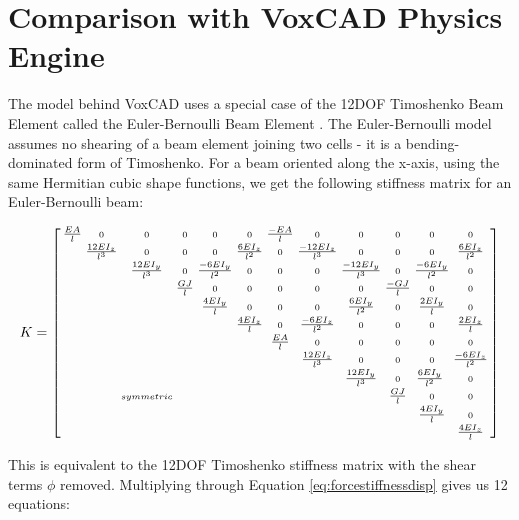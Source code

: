 {\section{Comparison with VoxCAD Physics Engine}

The model behind VoxCAD uses a special case of the 12DOF Timoshenko Beam Element called the Euler-Bernoulli Beam Element \cite{Hiller2014a}.  The Euler-Bernoulli model assumes no shearing of a beam element joining two cells - it is a bending-dominated form of Timoshenko.  For a beam oriented along the x-axis, using the same Hermitian cubic shape functions, we get the following stiffness matrix for an Euler-Bernoulli beam:

\[ K =  \small {\left[ \begin{smallmatrix}
\tfrac{EA}{l} & 0 & 0 & 0 & 0 & 0 & \tfrac{-EA}{l} & 0 & 0 & 0 & 0 & 0\\
 & \tfrac{12EI_z}{l^3} & 0 & 0 & 0 & \tfrac{6EI_z}{l^2} & 0 & \tfrac{-12EI_z}{l^3} & 0 & 0 & 0 & \tfrac{6EI_z}{l^2}\\
 &  & \tfrac{12EI_y}{l^3} & 0 & \tfrac{-6EI_y}{l^2} & 0 & 0 & 0 & \tfrac{-12EI_y}{l^3} & 0 & \tfrac{-6EI_y}{l^2} & 0\\
 &  &  &  \tfrac{GJ}{l} &  0 &  0 &  0 &  0 &  0 & \tfrac{-GJ}{l} & 0 & 0\\
 &  &  &  & \tfrac{4EI_y}{l} & 0 & 0 & 0 & \tfrac{6EI_y}{l^2} & 0 & \tfrac{2EI_y}{l} & 0\\
 &  &  &  &  & \tfrac{4EI_z}{l} & 0 & \tfrac{-6EI_z}{l^2} & 0 & 0 & 0 & \tfrac{2EI_z}{l}\\
 &  &  &  &  &  & \tfrac{EA}{l}  & 0 & 0 & 0 & 0 & 0\\
 &  &  &  &  &  &  & \tfrac{12EI_z}{l^3} & 0 & 0 & 0 & \tfrac{-6EI_z}{l^2}\\
 &  &  &  &  &  &  &  & \tfrac{12EI_y}{l^3} & 0 & \tfrac{6EI_y}{l^2}\ & 0\\
 &  & symmetric &  &  &  &  &  &  & \tfrac{GJ}{l} & 0 & 0\\
 &  &  &  &  &  &  &  &  &  & \tfrac{4EI_y}{l} & 0\\
  &  &  &  &  &  &  &  &  &  &  & \tfrac{4EI_z}{l}\\
 \end{smallmatrix} \right] } \]
 
 This is equivalent to the 12DOF Timoshenko stiffness matrix with the shear terms $\phi$ removed.  Multiplying through Equation \ref{eq:forcestiffnessdisp} gives us 12 equations:

}
